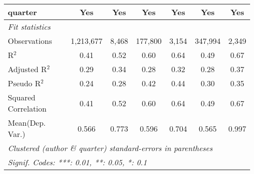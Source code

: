 \begin{tabular}{lcccccc}
   quarter                                                    & Yes            & Yes           & Yes            & Yes     & Yes            & Yes\\  
   \midrule
   \emph{Fit statistics}\\
   Observations                                               & 1,213,677      & 8,468         & 177,800        & 3,154   & 347,994        & 2,349\\  
   R$^2$                                                      & 0.41           & 0.52          & 0.60           & 0.64    & 0.49           & 0.67\\  
   Adjusted R$^2$                                             & 0.29           & 0.34          & 0.28           & 0.32    & 0.28           & 0.37\\  
   Pseudo R$^2$                                               & 0.24           & 0.28          & 0.42           & 0.44    & 0.30           & 0.35\\  
   Squared Correlation                                        & 0.41           & 0.52          & 0.60           & 0.64    & 0.49           & 0.67\\  
Mean(Dep. Var.) & 0.566 & 0.773 & 0.596 & 0.704 & 0.565 & 0.997 \\
   \midrule \midrule
   \multicolumn{7}{l}{\emph{Clustered (author \& quarter) standard-errors in parentheses}}\\
   \multicolumn{7}{l}{\emph{Signif. Codes: ***: 0.01, **: 0.05, *: 0.1}}\\
\end{tabular}
\par\endgroup

